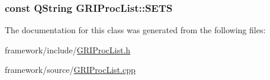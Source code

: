 \hypertarget{classGRIProcList_a17ea902e8a8383c6b9351b0271eba0e8}{
\subsubsection[{\-S\-E\-T\-S}]{\setlength{\rightskip}{0pt plus 5cm}const \-Q\-String {\bf \-G\-R\-I\-Proc\-List\-::\-S\-E\-T\-S}}}\label{classGRIProcList_a17ea902e8a8383c6b9351b0271eba0e8}


\-The documentation for this class was generated from the following files\-:\begin{DoxyCompactItemize}
\item 
framework/include/\hyperlink{GRIProcList_8h}{\-G\-R\-I\-Proc\-List.\-h}\item 
framework/source/\hyperlink{GRIProcList_8cpp}{\-G\-R\-I\-Proc\-List.\-cpp}\end{DoxyCompactItemize}
